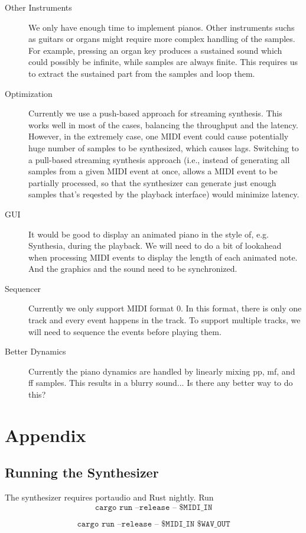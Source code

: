 \documentclass{article}
\begin{document}
\begin{description}
  \item [Other Instruments] We only have enough time to implement pianos.
    Other instruments suchs as guitars or organs might require more complex
    handling of the samples. For example, pressing an organ key produces
    a sustained sound which could possibly be infinite, while samples
    are always finite. This requires us to extract the sustained part from
    the samples and loop them.

  \item [Optimization] Currently we use a push-based approach for streaming
    synthesis. This works well in most of the cases, balancing the throughput
    and the latency. However, in the extremely case, one MIDI event could cause
    potentially huge number of samples to be synthesized, which causes lags.
    Switching to a pull-based streaming synthesis approach (i.e., instead of
    generating all samples from a given MIDI event at once, allows a MIDI event
    to be partially processed, so that the synthesizer can generate just enough
    samples that's reqested by the playback interface) would minimize
    latency.

  \item [GUI] It would be good to display an animated piano in the style
    of, e.g. Synthesia, during the playback. We will need to do a bit of
    lookahead when processing MIDI events to display the length of each
    animated note. And the graphics and the sound need to be synchronized.

  \item [Sequencer] Currently we only support MIDI format 0. In this format, there
    is only one track and every event happens in the track. To support
    multiple tracks, we will need to sequence the events before playing them.

  \item [Better Dynamics] Currently the piano dynamics are handled by
    linearly mixing pp, mf, and ff samples. This results in a blurry sound...
    Is there any better way to do this?
\end{description}

\section{Appendix}

\subsection{Running the Synthesizer}

The synthesizer requires portaudio and Rust nightly. Run
$$
\texttt{cargo run --release -- \$MIDI\_IN}
$$

$$
\texttt{cargo run --release -- \$MIDI\_IN \$WAV\_OUT}
$$
\end{document}
